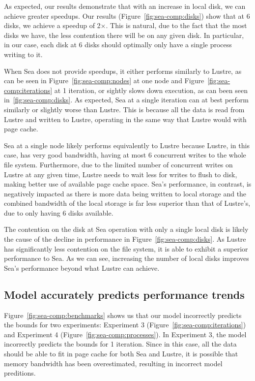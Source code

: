       As expected, our results demonstrate that with an increase in local disk,
      we can achieve greater speedups. Our results
      (Figure~\ref{fig:sea-comp:disks}) show that at 6 disks, we achieve a
      speedup of 2$\times$. This is natural, due to the fact that the most disks
      we have, the less contention there will be on any given disk. In
      particular, in our case, each disk at 6 disks should optimally only have a
      single process writing to it.

      When Sea does not provide speedups, it either performs similarly to
      Lustre, as can be seen in Figure~\ref{fig:sea-comp:nodes} at one node and
      Figure~\ref{fig:sea-comp:iterations} at 1 iteration, or sightly slows down
      execution, as can been seen in~\ref{fig:sea-comp:disks}. As expected,
      Sea at a single iteration can at best perform similarly or slightly worse than
      Lustre. This is because all the data is read from Lustre and written to
      Lustre, operating in the same way that Lustre would with page cache.

      Sea at a single node likely performs equivalently to Lustre because
      Lustre, in this case, has very good bandwidth, having at most 6 concurrent
      writes to the whole file system. Furthermore, due to the limited number of
      concurrent writes on Lustre at any given time, Lustre needs to wait less
      for writes to flush to disk, making better use of available page cache
      space. Sea's performance, in contrast, is negatively impacted as there is
      more data being written to local storage and the combined bandwidth of the
      local storage is far less superior than that of Lustre's, due to only
      having 6 disks available.

      The contention on the disk at Sea operation with only a single local disk
      is likely the cause of the decline in performance in
      Figure~\ref{fig:sea-comp:disks}. As Lustre has significantly less
      contention on the file system, it is able to exhibit a superior
      performance to Sea. As we can see, increasing the number of local disks
      improves Sea's performance beyond what Lustre can achieve.
    

      \subsection{Model accurately predicts performance trends}

      Figure~\ref{fig:sea-comp:benchmarks} shows us that our model incorrectly predicts
      the bounds for two experiments: Experiment 3 (Figure~\ref{fig:sea-comp:iterations})
      and Experiment 4 (Figure~\ref{fig:sea-comp:processes}). In Experiment 3, the model incorrectly
      predicts the bounds for 1 iteration. Since in this case, all the data should be able to fit
      in page cache for both Sea and Lustre, it is possible that memory bandwidth has been
      overestimated, resulting in incorrect model preditions.

